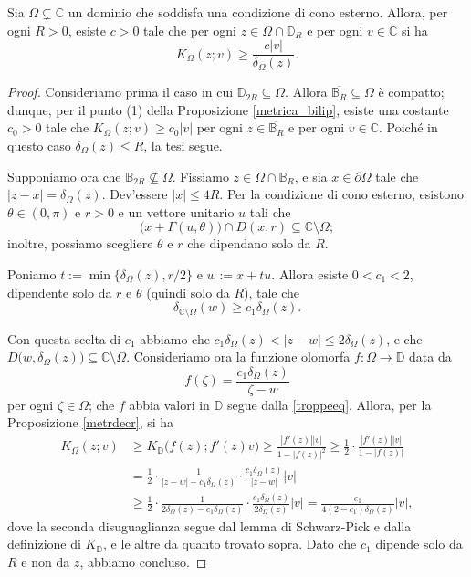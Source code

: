\begin{lm} \label{cones}
    Sia $\Omega\subsetneq\mathbb{C}$ un dominio che soddisfa una condizione di cono esterno. Allora, per ogni $R>0$, esiste $c>0$ tale che per ogni $z\in\Omega\cap\mathbb{D}_R$ e per ogni $v\in\mathbb{C}$ si ha
    $$K_\Omega(z;v) \ge \frac{c|v|}{\delta_\Omega(z)}.$$
\end{lm}

\begin{proof}
    Consideriamo prima il caso in cui $\mathbb{D}_{2R}\subseteq\Omega$. Allora $\overline{\mathbb{B}_R}\subseteq\Omega$ è compatto; dunque, per il punto (1) della Proposizione \ref{metrica_bilip}, esiste una costante $c_0>0$ tale che $K_\Omega(z;v)\ge c_0|v|$ per ogni $z\in \overline{\mathbb{B}_R}$ e per ogni $v\in\mathbb{C}$. Poiché in questo caso $\delta_\Omega(z)\le R$, la tesi segue.

    Supponiamo ora che $\mathbb{B}_{2R}\not\subseteq\Omega$. Fissiamo $z\in\Omega\cap\mathbb{B}_R$, e sia $x\in\partial\Omega$ tale che $|z-x|=\delta_\Omega(z)$. Dev'essere $|x|\le 4R$. Per la condizione di cono esterno, esistono $\theta\in(0,\pi)$ e $r>0$ e un vettore unitario $u$ tali che
    $$\big(x+\Gamma(u,\theta)\big)\cap D(x,r) \subseteq\mathbb{C}\setminus\Omega;$$
    inoltre, possiamo scegliere $\theta$ e $r$ che dipendano solo da $R$.

    Poniamo $t:=\min\{\delta_\Omega(z),r/2\}$ e $w:=x+tu$. Allora esiste $0<c_1<2$, dipendente solo da $r$ e $\theta$ (quindi solo da $R$), tale che
    \begin{equation}\label{troppeeq}
        \delta_{\mathbb{C}\setminus\Omega}(w)\ge c_1\delta_\Omega(z).
    \end{equation}

    Con questa scelta di $c_1$ abbiamo che $c_1\delta_\Omega(z)<|z-w|\le 2\delta_\Omega(z)$, e che ${D\big(w,\delta_\Omega(z)\big)\subseteq\mathbb{C}\setminus\Omega}$. Consideriamo ora la funzione olomorfa $f:\Omega\longrightarrow\mathbb{D}$ data da
    $$f(\zeta)=\frac{c_1\delta_\Omega(z)}{\zeta-w}$$
    per ogni $\zeta\in\Omega$; che $f$ abbia valori in $\mathbb{D}$ segue dalla \eqref{troppeeq}. Allora, per la Proposizione \ref{metrdecr}, si ha
    \begin{align*}
        K_\Omega(z;v) &\ge K_{\mathbb{D}}\big(f(z);f'(z)v\big)\ge \frac{|f'(z)||v|}{1-|f(z)|^2} \ge \frac{1}{2}\cdot\frac{|f'(z)||v|}{1-|f(z)|}\\
        &=\frac{1}{2}\cdot\frac{1}{|z-w|-c_1\delta_\Omega(z)}\cdot\frac{c_1\delta_\Omega(z)}{|z-w|}|v|\\
        &\ge \frac{1}{2}\cdot\frac{1}{2\delta_\Omega(z)-c_1\delta_\Omega(z)}\cdot\frac{c_1\delta_\Omega(z)}{2\delta_\Omega(z)}|v|=\frac{c_1}{4(2-c_1)\delta_\Omega(z)}|v|,
    \end{align*}
    dove la seconda disuguaglianza segue dal lemma di Schwarz-Pick e dalla definizione di $K_\mathbb{D}$, e le altre da quanto trovato sopra. Dato che $c_1$ dipende solo da $R$ e non da $z$, abbiamo concluso.
\end{proof}

